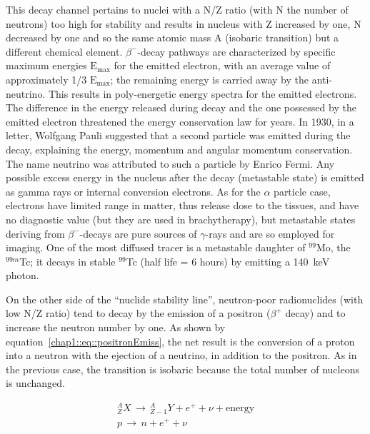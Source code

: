 This decay channel pertains to nuclei with a N/Z ratio (with N the number of neutrons) too high for stability and results in nucleus with Z increased by one, N decreased by one and so the same atomic mass A (isobaric transition) but a different chemical element. $\beta^-$-decay pathways are characterized by specific maximum energies $\mathrm{E_{max}}$ for the emitted electron, with an average value of approximately 1/3 $\mathrm{E_{max}}$; the remaining energy is carried away by the anti-neutrino. This results in poly-energetic energy spectra for the emitted electrons. The difference in the energy released during decay and the one possessed by the emitted electron threatened the energy conservation law for years. In 1930, in a letter, Wolfgang Pauli suggested that a second particle was emitted during the decay, explaining the energy, momentum and angular momentum conservation. The name neutrino was attributed to such a particle by Enrico Fermi. 
Any possible excess energy in the nucleus after the decay (metastable state) is emitted as gamma rays or internal conversion electrons. As for the $\alpha$ particle case, electrons have limited range in matter, thus release dose to the tissues, and have no diagnostic value (but they are used in brachytherapy), but metastable states deriving from $\beta^-$-decays are pure sources of $\gamma$-rays and are so employed for imaging. One of the most diffused tracer is a metastable daughter of $^{99}$Mo, the $^{99m}$Tc; it decays in stable $^{99}$Tc (half life = 6 hours) by emitting a 140~keV photon.   

On the other side of the \enquote{nuclide stability line},  neutron-poor radionuclides (with low N/Z ratio) tend to decay by the emission of a positron ($\beta^+$ decay) and to increase the neutron number by one. As shown by equation~\ref{chap1::eq::positronEmiss}, the net result is the conversion of a proton into a neutron with the ejection of a neutrino, in addition to the positron. As in the previous case, the transition is isobaric because the total number of nucleons is unchanged.

 \begin{equation}\label{chap1::eq::positronEmiss}
\begin{split}
^{A}_{Z}X \, \rightarrow \, ^{A}_{Z-1}Y + e^{+} + \nu + \mathrm{energy} \\
p \, \rightarrow \, n + e^{+} + \nu 
\end{split}
\end{equation}     

